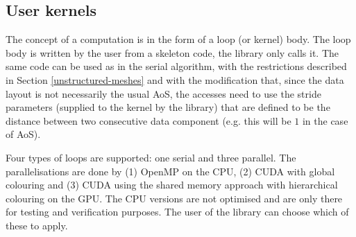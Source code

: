 



\subsection{User kernels}




The concept of a computation is in the form of a loop (or kernel) body. The loop
body is written by the user from a skeleton code, the library only calls it. The
same code can be used as in the serial algorithm, with the restrictions
described in Section \ref{unstructured-meshes} and with the modification that,
since the data layout is not necessarily the usual AoS, the accesses need to use
the stride parameters (supplied to the kernel by the library) that are defined
to be the distance between two consecutive data component (e.g. this will be $1$
in the case of AoS).

Four types of loops are supported: one serial and three parallel. The
parallelisations are done by (1) OpenMP on the CPU, (2) CUDA with global
colouring and (3) CUDA using the shared memory approach with hierarchical
colouring on the GPU. The CPU versions are not optimised and are only there for
testing and verification purposes. The user of the library can choose which of
these to apply.

